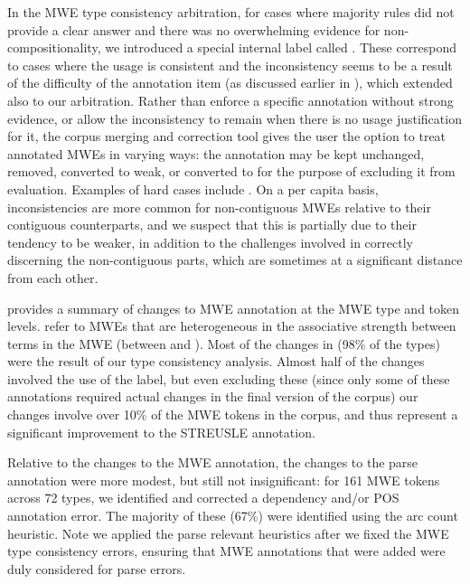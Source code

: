 \documentclass[output=paper
,modfonts
,nonflat]{langsci/langscibook}
\begin{document}
In the MWE type consistency arbitration, for cases where majority rules did not provide a clear answer and there was no overwhelming evidence for non-compositionality, we introduced a special internal label called . These correspond to cases where the usage is consistent and the inconsistency seems to be a result of the difficulty of the annotation item (as discussed earlier in ), which extended also to our arbitration. Rather than enforce a specific annotation without strong evidence, or allow the inconsistency to remain when there is no usage justification for it, the corpus merging and correction tool gives the user the option to treat  annotated MWEs in varying ways: the annotation may be kept unchanged, removed, converted to weak, or converted to  for the purpose of excluding it from evaluation. Examples of hard cases include . On a per capita basis, inconsistencies are more common for non-contiguous MWEs relative to their contiguous counterparts, and we suspect that this is partially due to their tendency to be weaker, in addition to the challenges involved in correctly discerning the non-contiguous parts, which are sometimes at a significant distance from each other. 

 provides a summary of changes to MWE annotation at the MWE type and token levels.   refer to MWEs that are heterogeneous in the associative strength between terms in the MWE (between \weak and \strongish). Most of the changes in  (98\% of the types) were the result of our type consistency analysis. Almost half of the changes involved the use of the \hard label, but even excluding these (since only some of these annotations required actual changes in the final version of the corpus) our changes involve over 10\% of the MWE tokens in the corpus, and thus represent a significant improvement to the STREUSLE annotation.  

Relative to the changes to the MWE annotation, the changes to the parse annotation were more modest, but still not insignificant: for 161 MWE tokens across 72 types, we identified and corrected a dependency and/or POS annotation error. The majority of these (67\%) were identified using the arc count heuristic. Note we applied the parse relevant heuristics after we fixed the MWE type consistency errors, ensuring that MWE annotations that were added were duly considered for parse errors.
\end{document}
